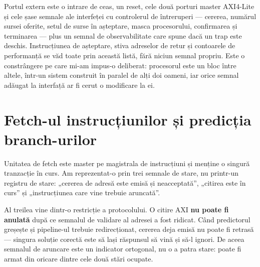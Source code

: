 \documentclass[11pt,openany]{report}
\begin{document}
Portul extern este o intrare de ceas, un reset, cele două porturi master
AXI4-Lite și cele șase semnale ale interfeței cu controlerul de întreruperi ---
cererea, numărul sursei oferite, setul de surse în așteptare, masca procesorului,
confirmarea și terminarea --- plus un semnal de observabilitate care spune dacă
un trap este deschis. Instrucțiunea de așteptare, stiva adreselor de retur și
contoarele de performanță se văd toate prin această listă, fără niciun semnal
propriu. Este o constrângere pe care mi-am
impus-o deliberat: procesorul este un bloc între altele, într-un sistem construit
în paralel de alți doi oameni, iar orice semnal adăugat la interfață ar fi cerut
o modificare la ei.

\section{Fetch-ul instrucțiunilor și predicția branch-urilor}

Unitatea de fetch este master pe magistrala de instrucțiuni și menține o
singură tranzacție în curs. Am reprezentat-o prin trei semnale de stare, nu
printr-un registru de stare: „cererea de adresă este emisă și neacceptată”,
„citirea este în curs” și „instrucțiunea care vine trebuie aruncată”.

Al treilea vine dintr-o restricție a protocolului. O citire AXI
\textbf{nu poate fi anulată} după ce semnalul de validare al adresei a fost
ridicat. Când predictorul greșește și pipeline-ul trebuie redirecționat, cererea
deja emisă nu poate fi retrasă --- singura soluție corectă este să lași
răspunsul să vină și să-l ignori. De aceea semnalul de aruncare este un indicator
ortogonal, nu o a patra stare: poate fi armat din oricare dintre cele două stări
ocupate.
\end{document}
